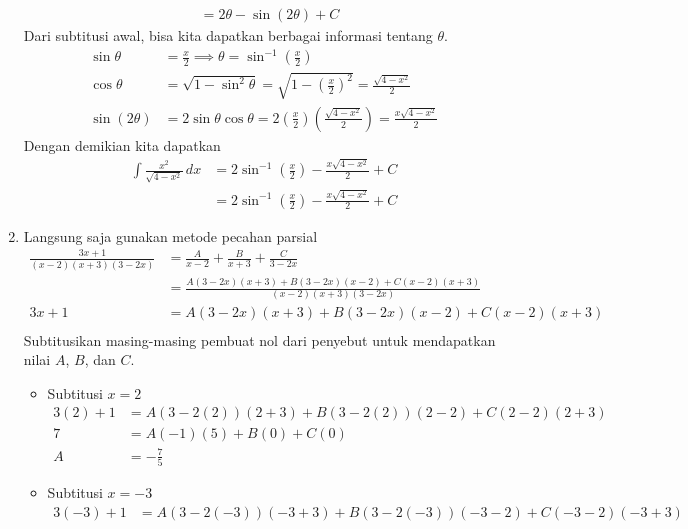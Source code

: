 \documentclass[11pt,openany,a4paper]{article}
\begin{document}
\begin{enumerate}
\begin{align*}
          &= 2\theta - \sin(2\theta) + C 
        \end{align*}
        Dari subtitusi awal, bisa kita dapatkan berbagai informasi tentang $\theta$.
        \begin{align*}
          \sin\theta &= \frac{x}{2} \implies \theta = \sin^{-1}\left(\frac{x}{2}\right) \\
          \cos\theta &= \sqrt{1 - \sin^2\theta} = \sqrt{1 - \left(\frac{x}{2}\right)^2} = \frac{\sqrt{4 - x^2}}{2} \\
          \sin(2\theta) &= 2\sin\theta\cos\theta = 2\left(\frac{x}{2}\right)\left(\frac{\sqrt{4 - x^2}}{2}\right) = \frac{x\sqrt{4 - x^2}}{2}
        \end{align*}
        Dengan demikian kita dapatkan
        \begin{align*}
          \int \frac{x^2}{\sqrt{4 - x^2}} \, dx &= 2\sin^{-1}\left(\frac{x}{2}\right) - \frac{x\sqrt{4 - x^2}}{2} + C \\
          &= \boxed{2\sin^{-1}\left(\frac{x}{2}\right) - \frac{x\sqrt{4 - x^2}}{2} + C}
        \end{align*}
        \item Langsung saja gunakan metode pecahan parsial
        \begin{align*}
          \frac{3x + 1}{(x - 2)(x + 3)(3 - 2x)} &= \frac{A}{x - 2} + \frac{B}{x + 3} + \frac{C}{3 - 2x} \\
          &= \frac{A(3 - 2x)(x + 3) + B(3 - 2x)(x - 2) + C(x - 2)(x + 3)}{(x - 2)(x + 3)(3 - 2x)} \\
          3x + 1 &= A(3 - 2x)(x + 3) + B(3 - 2x)(x - 2) + C(x - 2)(x + 3) \\
        \end{align*}
        Subtitusikan masing-masing pembuat nol dari penyebut untuk mendapatkan nilai $A$, $B$, dan $C$.
        \begin{itemize}
          \item Subtitusi $x=2$
          \begin{align*}
            3(2) + 1 &= A(3 - 2(2))(2 + 3) + B(3 - 2(2))(2 - 2) + C(2 - 2)(2 + 3) \\
            7 &= A(-1)(5) + B(0) + C(0) \\
            A &= -\frac{7}{5}
          \end{align*}
          \item Subtitusi $x=-3$
          \begin{align*}
            3(-3) + 1 &= A(3 - 2(-3))(-3 + 3) + B(3 - 2(-3))(-3 - 2) + C(-3 - 2)(-3 + 3) \\

\end{align*}
\end{itemize}
\end{enumerate}
\end{document}
